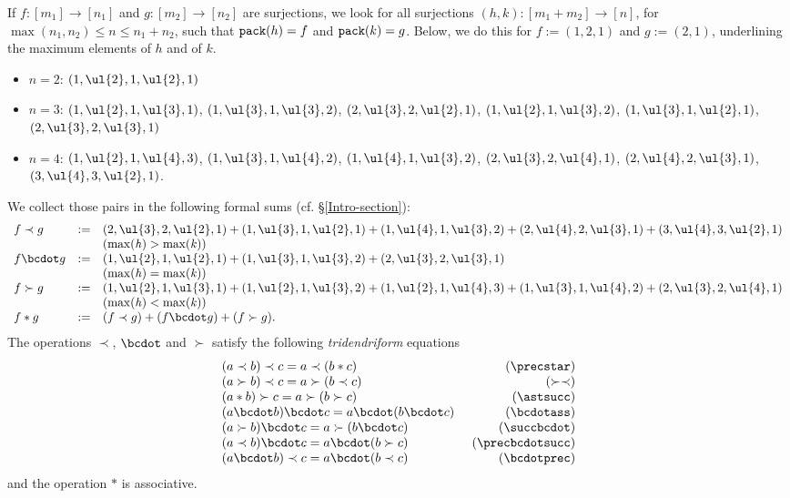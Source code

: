 If $f:[m_1]\rightarrow[n_1]$ and $g:[m_2]\rightarrow[n_2]$ are surjections, we look for 
 all surjections $(h,k):[m_1+m_2]\rightarrow [n]$, for $\max(n_1,n_2)\leq n\leq n_1+n_2$,  such that
 ${\tt pack}(h)=f$ and ${\tt pack}(k)=g$.  Below, we do this for 
$f:=(1,2,1)$ and $g:=(2,1)$, underlining the maximum elements  of $h$ and of $k$.
\begin{itemize}
\item {\small $n=2$:   $(1,\ul{2},1,\ul{2},1)$}
\item {\small $n=3$: $(1,\ul{2},1,\ul{3},1)$, $(1,\ul{3},1,\ul{3},2)$, $(2,\ul{3},2,\ul{2},1)$, $(1,\ul{2},1,\ul{3},2)$,  $(1,\ul{3},1,\ul{2},1)$,  $(2,\ul{3},2,\ul{3},1)$}
\item {\small $n=4$:
$(1,\ul{2},1,\ul{4},3)$, $(1,\ul{3},1,\ul{4},2)$,  $(1,\ul{4},1,\ul{3},2)$,  $(2,\ul{3},2,\ul{4},1)$, $(2,\ul{4},2,\ul{3},1)$, $(3,\ul{4},3,\ul{2},1)$.}
\end{itemize}
We collect those pairs in the following formal sums (cf. \S\ref{Intro-section}): 
{\small{$$\begin{array}{lll}
 f\prec g&  := & {(2,\ul{3},2,\ul{2},1)} 
 +  {(1,\ul{3},1,\ul{2},1)} 
 +  {(1,\ul{4},1,\ul{3},2)} 
 +  {(2,\ul{4},2,\ul{3},1)} 
 +  (3,\ul{4},3,\ul{2},1)  \\
 && \mathit{(\max(h)>\max(k))}\\
  f\bcdot g & := &  {(1,\ul{2},1,\ul{2},1)} +  {(1,\ul{3},1,\ul{3},2)} + { (2,\ul{3},2,\ul{3},1)} \\
  && \mathit{(\max(h)=\max(k))}\\
  {  f\succ g}&  := &  {  (1,\ul{2},1,\ul{3},1)} 
  +  {  (1,\ul{2},1,\ul{3},2)}
  +  {  (1,\ul{2},1,\ul{4},3)}   +  {  (1,\ul{3},1,\ul{4},2)}
    +   {  (2,\ul{3},2,\ul{4},1)} \\
   & &\mathit{(\max(h)<\max(k))}\\
  f\ast g&  := & ({  f\prec g}) + ({  f\bcdot g}) + ({ f\succ g}).
\end{array}$$}}
\normalsize
   The operations $\prec$, $\bcdot$ and $\succ$ satisfy the following {\em tridendriform} equations
$$\begin{array}{lr}
 (a\prec b)\prec c=a\prec(b\ast c) & \quad\quad\quad\mathit{(\precstar)} \\
 (a\succ b)\prec c=a\succ(b\prec c) & \mathit{(\succ\prec)} \\
 (a\ast b)\succ c=a\succ(b\succ c) & \mathit{(\astsucc)} \\
(a\bcdot b)\bcdot c=a\bcdot(b\bcdot c) & \mathit{(\bcdotass)} \\
 (a\succ b)\bcdot c=a\succ(b\bcdot c) & \mathit{(\succbcdot)}  \\
 (a\prec b)\bcdot c=a\bcdot (b\succ c) & \mathit{(\precbcdotsucc)} \\ 
(a\bcdot b)\prec c=a\bcdot (b\prec c) & \mathit{(\bcdotprec)} \\
\end{array}$$
  and  the operation $\ast$ is associative.

